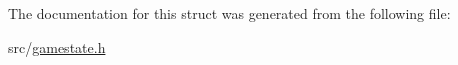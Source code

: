 \begin{DoxyCompactItemize}
\end{tabbing}\end{DoxyCompactItemize}


The documentation for this struct was generated from the following file\+:\begin{DoxyCompactItemize}
\item 
src/\hyperlink{gamestate_8h}{gamestate.\+h}\end{DoxyCompactItemize}
